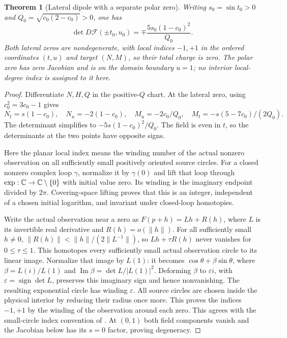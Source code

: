 \documentclass[11pt,a4paper]{article}
\newtheorem{theorem}{Theorem}[section]
\theoremstyle{definition}\newtheorem{definition}[theorem]{Definition}
\theoremstyle{remark}\newtheorem{remark}[theorem]{Remark}
\newcommand{\Map}{\mathcal F}\newcommand{\Pcore}{\mathcal P}
\begin{document}
\begin{theorem}[Lateral dipole with a separate polar zero]\label{thm:dipole}
Writing $s_0=\sin t_0>0$ and $Q_0=\sqrt{c_0(2-c_0)}>0$, one has
\[
 \det D\Map(\pm t_0,u_0)=\mp\frac{5s_0(1-c_0)^2}{Q_0}.
\]
Both lateral zeros are nondegenerate, with local indices $-1,+1$
in the ordered coordinates $(t,u)$ and target $(N,M)$, so their total
charge is zero. The polar zero has zero Jacobian and is on the domain
boundary $u=1$; no interior local-degree index is assigned to it here.
\end{theorem}
\begin{proof}
Differentiate $N,H,Q$ in the positive-$Q$ chart. At the lateral zero,
using $c_0^2=3c_0-1$ gives
\[
 N_t=s(1-c_0),\quad N_u=-2(1-c_0),\quad
 M_u=-2c_0/Q_0,\quad M_t=-s(5-7c_0)/(2Q_0).
\]
The determinant simplifies to $-5s(1-c_0)^2/Q_0$. The field is even
in $t$, so the determinants at the two points have opposite signs.

Here the planar local index means the winding number of the actual
nonzero observation on all sufficiently small positively oriented source
circles. For a closed nonzero complex loop $\gamma$, normalize it by
$\gamma(0)$ and lift that loop through $\exp:\mathbb C\to\mathbb C\setminus\{0\}$
with initial value zero. Its winding is the imaginary endpoint divided by
$2\pi$. Covering-space lifting proves that this is an integer, independent
of a chosen initial logarithm, and invariant under closed-loop homotopies.

Write the actual observation near a zero as $F(p+h)=Lh+R(h)$, where
$L$ is its invertible real derivative and $R(h)=o(\lVert h\rVert)$.
For all sufficiently small $h\ne0$,
$\lVert R(h)\rVert<\lVert h\rVert/(2\lVert L^{-1}\rVert)$,
so $Lh+\tau R(h)$ never vanishes for $0\leq\tau\leq1$.
This homotopes every sufficiently small actual observation circle to its
linear image. Normalize that image by $L(1)$: it becomes
$\cos\theta+\beta\sin\theta$, where $\beta=L(i)/L(1)$ and
$\operatorname{Im}\beta=\det L/|L(1)|^2$.
Deforming $\beta$ to $\varepsilon i$, with
$\varepsilon=\operatorname{sign}\det L$, preserves this imaginary sign
and hence nonvanishing. The resulting exponential circle has winding
$\varepsilon$. All source circles are chosen inside the physical interior
by reducing their radius once more. This proves the indices $-1,+1$
by the winding of the observation around each zero. This agrees with the
small-circle index convention of \cite[Section 6, pp.~32--35]{degree}.
At $(0,1)$ both field components vanish and the Jacobian below has its
$s=0$ factor, proving degeneracy.
\end{proof}
\end{document}
